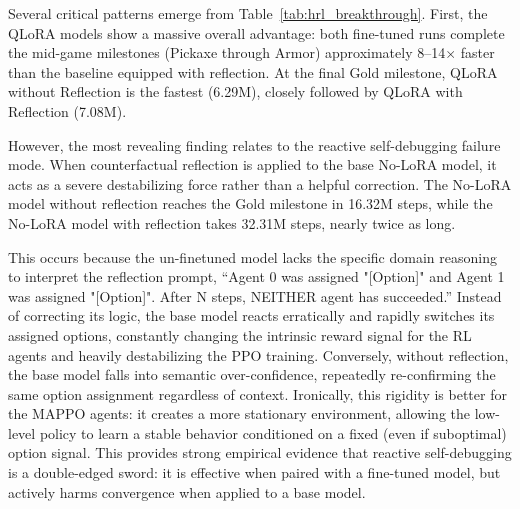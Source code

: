 Several critical patterns emerge from Table~\ref{tab:hrl_breakthrough}. First, the QLoRA models show a massive overall advantage: both fine-tuned runs complete the mid-game milestones (Pickaxe through Armor) approximately 8--14$\times$ faster than the baseline equipped with reflection. At the final Gold milestone, QLoRA without Reflection is the fastest (6.29M), closely followed by QLoRA with Reflection (7.08M).

However, the most revealing finding relates to the reactive self-debugging failure mode. When counterfactual reflection is applied to the base No-LoRA model, it acts as a severe destabilizing force rather than a helpful correction. The No-LoRA model without reflection reaches the Gold milestone in 16.32M steps, while the No-LoRA model with reflection takes 32.31M steps, nearly twice as long. 

This occurs because the un-finetuned model lacks the specific domain reasoning to interpret the reflection prompt, ``Agent 0 was assigned "[Option]" and Agent 1 was assigned "[Option]". After N steps, NEITHER agent has succeeded.'' Instead of correcting its logic, the base model reacts erratically and rapidly switches its assigned options, constantly changing the intrinsic reward signal for the RL agents and heavily destabilizing the PPO training. Conversely, without reflection, the base model falls into semantic over-confidence, repeatedly re-confirming the same option assignment regardless of context. Ironically, this rigidity is better for the MAPPO agents: it creates a more stationary environment, allowing the low-level policy to learn a stable behavior conditioned on a fixed (even if suboptimal) option signal. This provides strong empirical evidence that reactive self-debugging is a double-edged sword: it is effective when paired with a fine-tuned model, but actively harms convergence when applied to a base model.

